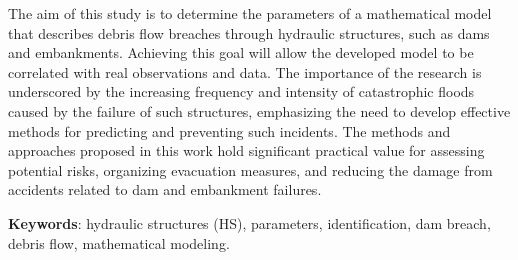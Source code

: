 The aim of this study is to determine the parameters of a mathematical
model that describes debris flow breaches through hydraulic structures,
such as dams and embankments. Achieving this goal will allow the
developed model to be correlated with real observations and data. The
importance of the research is underscored by the increasing frequency
and intensity of catastrophic floods caused by the failure of such
structures, emphasizing the need to develop effective methods for
predicting and preventing such incidents. The methods and approaches
proposed in this work hold significant practical value for assessing
potential risks, organizing evacuation measures, and reducing the damage
from accidents related to dam and embankment failures.

{\bfseries Keywords}: hydraulic structures (HS), parameters,
identification, dam breach, debris flow, mathematical modeling.

